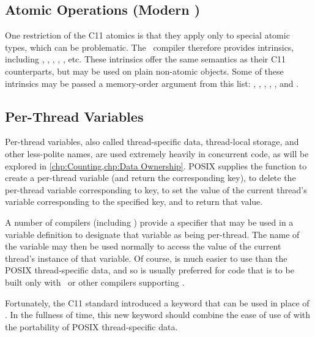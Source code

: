\subsection{Atomic Operations (Modern \GCC)}
\label{sec:toolsoftrade:Atomic Operations (Modern gcc)}

One restriction of the C11 atomics is that they apply only to special
atomic types, which can be problematic.
The \GNUC\ compiler therefore provides  intrinsics, including
,
,
,
,
, etc.
These intrinsics offer the same semantics as their C11 counterparts,
but may be used on plain non-atomic objects.
Some of these intrinsics may be passed a memory-order argument from
this list:
,
,
,
,
, and
.

\subsection{Per-Thread Variables}
\label{sec:toolsoftrade:Per-Thread Variables}

Per-thread variables, also called thread-specific data, thread-local
storage, and other less-polite names, are used extremely
heavily in concurrent code, as will be explored in
\cref{chp:Counting,chp:Data Ownership}.
POSIX supplies the  function to create a
per-thread variable (and return the corresponding key),
 to delete the per-thread variable corresponding
to key,
 to set the value of the current thread's
variable corresponding to the specified key,
and  to return that value.

A number of compilers (including \GCC) provide a  specifier
that may be used in a variable definition to designate that variable
as being per-thread.
The name of the variable may then be used normally to access the
value of the current thread's instance of that variable.
Of course,  is much easier to use than the POSIX
thread-specific data, and so  is usually preferred for
code that is to be built only with \GCC\ or other compilers supporting
.

Fortunately, the C11 standard introduced a  keyword
that can be used in place of .
In the fullness of time, this new keyword should combine the ease of use
of  with the portability of POSIX thread-specific data.

